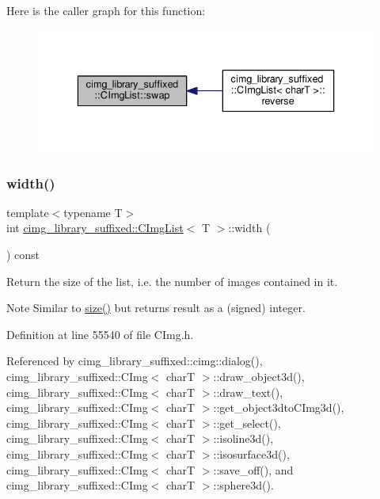 Here is the caller graph for this function\+:
\nopagebreak
\begin{figure}[H]
\begin{center}
\leavevmode
\includegraphics[width=336pt]{d5/d7e/structcimg__library__suffixed_1_1CImgList_ad88b574b18ddf25e9be41d346584236b_icgraph}
\end{center}
\end{figure}
\mbox{\label{structcimg__library__suffixed_1_1CImgList_a60d81967a11f946a46ab28f2f14109f7}} 
\subsubsection{\texorpdfstring{width()}{width()}}
{\footnotesize\ttfamily template$<$typename T$>$ \\
int \hyperlink{structcimg__library__suffixed_1_1CImgList}{cimg\+\_\+library\+\_\+suffixed\+::\+C\+Img\+List}$<$ T $>$\+::width (\begin{DoxyParamCaption}{ }\end{DoxyParamCaption}) const\hspace{0.3cm}{\ttfamily [inline]}}



Return the size of the list, i.\+e. the number of images contained in it. 

\begin{DoxyNote}{Note}
Similar to \hyperlink{structcimg__library__suffixed_1_1CImgList_aee903f446b109a60b1107be84f31b01e}{size()} but returns result as a (signed) integer. 
\end{DoxyNote}


Definition at line 55540 of file C\+Img.\+h.



Referenced by cimg\+\_\+library\+\_\+suffixed\+::cimg\+::dialog(), cimg\+\_\+library\+\_\+suffixed\+::\+C\+Img$<$ char\+T $>$\+::draw\+\_\+object3d(), cimg\+\_\+library\+\_\+suffixed\+::\+C\+Img$<$ char\+T $>$\+::draw\+\_\+text(), cimg\+\_\+library\+\_\+suffixed\+::\+C\+Img$<$ char\+T $>$\+::get\+\_\+object3dto\+C\+Img3d(), cimg\+\_\+library\+\_\+suffixed\+::\+C\+Img$<$ char\+T $>$\+::get\+\_\+select(), cimg\+\_\+library\+\_\+suffixed\+::\+C\+Img$<$ char\+T $>$\+::isoline3d(), cimg\+\_\+library\+\_\+suffixed\+::\+C\+Img$<$ char\+T $>$\+::isosurface3d(), cimg\+\_\+library\+\_\+suffixed\+::\+C\+Img$<$ char\+T $>$\+::save\+\_\+off(), and cimg\+\_\+library\+\_\+suffixed\+::\+C\+Img$<$ char\+T $>$\+::sphere3d().

